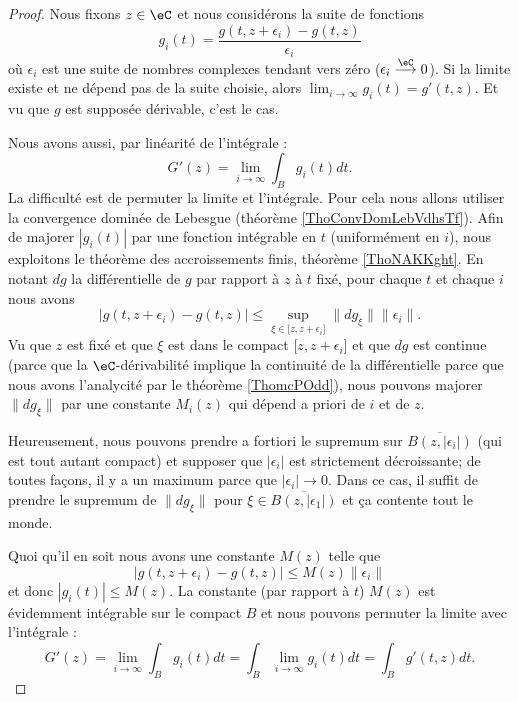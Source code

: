 \begin{proof}
    Nous fixons \( z\in \eC\) et nous considérons la suite de fonctions
    \begin{equation}
        g_i(t)=\frac{ g(t,z+\epsilon_i)-g(t,z) }{ \epsilon_i }
    \end{equation}
    où \( \epsilon_i\) est une suite de nombres complexes tendant vers zéro (\( \epsilon_i\stackrel{\eC}{\longrightarrow}0\)). Si la limite existe et ne dépend pas de la suite choisie, alors \( \lim_{i\to \infty} g_i(t)=g'(t,z)\). Et vu que \( g\) est supposée dérivable, c'est le cas.

    Nous avons aussi, par linéarité de l'intégrale :
    \begin{equation}
        G'(z)=\lim_{i\to \infty} \int_B g_i(t)dt.
    \end{equation}
    La difficulté est de permuter la limite et l'intégrale. Pour cela nous allons utiliser la convergence dominée de Lebesgue (théorème \ref{ThoConvDomLebVdhsTf}). Afin de majorer \( | g_i(t) |\) par une fonction intégrable en \( t\) (uniformément en \( i\)), nous exploitons le théorème des accroissements finis, théorème \ref{ThoNAKKght}. En notant \( dg\) la différentielle de \( g\) par rapport à \( z\) à \( t\) fixé, pour chaque \( t\) et chaque \( i\) nous avons
    \begin{equation}
        | g(t,z+\epsilon_i)-g(t,z) |\leq \sup_{\xi\in\mathopen[ z , z+\epsilon_i \mathclose]}\| dg_{\xi} \|\| \epsilon_i \|.
    \end{equation}
    Vu que \( z\) est fixé et que \( \xi\) est dans le compact \( \mathopen[ z , z+\epsilon_i \mathclose]\) et que \( dg\) est continue (parce que la \( \eC\)-dérivabilité implique la continuité de la différentielle parce que nous avons l'analycité par le théorème \ref{ThomcPOdd}), nous pouvons majorer \( \| dg_{\xi} \|\) par une constante \( M_i(z)\) qui dépend a priori de \( i\) et de \( z\).

    Heureusement, nous pouvons prendre a fortiori le supremum sur \( \overline{ B(z,|\epsilon_i|) }\) (qui est tout autant compact) et supposer que \( | \epsilon_i |\) est strictement décroissante; de toutes façons, il y a un maximum parce que \( | \epsilon_i |\to 0\). Dans ce cas, il suffit de prendre le supremum de \( \| dg_{\xi} \|\) pour \( \xi\in \overline{ B(z,| \epsilon_1 |) }\) et ça contente tout le monde.

    Quoi qu'il en soit nous avons une constante \( M(z)\) telle que
    \begin{equation}
        | g(t,z+\epsilon_i)-g(t,z) |\leq M(z)\| \epsilon_i \|
    \end{equation}
    et donc \( | g_i(t) |\leq M(z)\). La constante (par rapport à \( t\)) \( M(z)\) est évidemment intégrable sur le compact \( B\) et nous pouvons permuter la limite avec l'intégrale :
    \begin{equation}
        G'(z)=\lim_{i\to \infty} \int_Bg_i(t)dt=\int_B\lim_{i\to \infty} g_i(t)dt=\int_Bg'(t,z)dt.
    \end{equation}
\end{proof}

